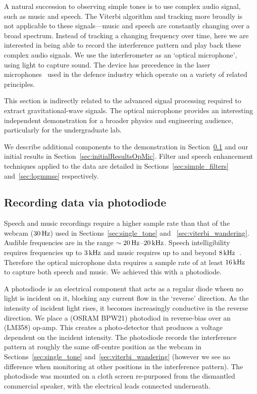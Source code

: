 \documentclass[paper-main.tex]{subfiles}
\begin{document}

A natural succession to observing simple tones is to use complex audio signal, such as music and speech. 
The Viterbi algorithm and tracking more broadly is not applicable to these signals---music and speech are constantly changing over a broad spectrum. 
Instead of tracking a changing frequency over time, here we are interested in being able to record the interference pattern and play back these complex audio signals. 
We use the interferometer as an `optical microphone', using light to capture sound. 
The device has precedence in the laser microphones~\cite{laser_microphone} used in the defence industry which operate on a variety of related principles.

This section is indirectly related to the advanced signal processing required to extract gravitational-wave signals. 
The optical microphone provides an interesting independent demonstration for a broader physics and engineering audience, particularly for the undergraduate lab. 

We describe additional components to the demonstration in Section~\ref{sec:photodiode} and our initial results in Section~\ref{sec:initialResultsOpMic}.
Filter and speech enhancement techniques applied to the data are detailed in Sections~\ref{sec:simple_filters} and~\ref{sec:logmmse} respectively.


\subsection{Recording data via photodiode}
\label{sec:photodiode}

Speech and music recordings require a higher sample rate than that of the webcam ($30\,{\rm Hz}$) used in Sections~\ref{sec:single_tone} and ~\ref{sec:viterbi_wandering}. 
Audible frequencies are in the range $\sim 20\,{\rm Hz}$--$20\,{\rm kHz}$. 
Speech intelligibility requires frequencies up to $3\,{\rm kHz}$ and music requires up to and beyond $8\,{\rm kHz}$~\cite{speech_intelligibility}. 
Therefore the optical microphone data requires a sample rate of at least $16\,{\rm kHz}$ to capture both speech and music. 
We achieved this with a photodiode.


A photodiode is an electrical component that acts as a regular diode wheen no light is incident on it, blocking any current flow in the `reverse' direction.
As the intensity of incident light rises, it becomes increasingly conductive in the reverse direction. 
We place a (OSRAM BPW21) photodiod in reverse-bias over an (LM358) op-amp. 
This creates a photo-detector that produces a voltage dependent on the incident intensity. 
The photodiode records the interference pattern at roughly the same off-centre position as the webcam in Sections~\ref{sec:single_tone} and~\ref{sec:viterbi_wandering} (however we see no difference when monitoring at other positions in the interference pattern).
The photodiode was mounted on a cloth screen re-purposed from the dismantled commercial speaker, with the electrical leads connected underneath. 
\end{document}
